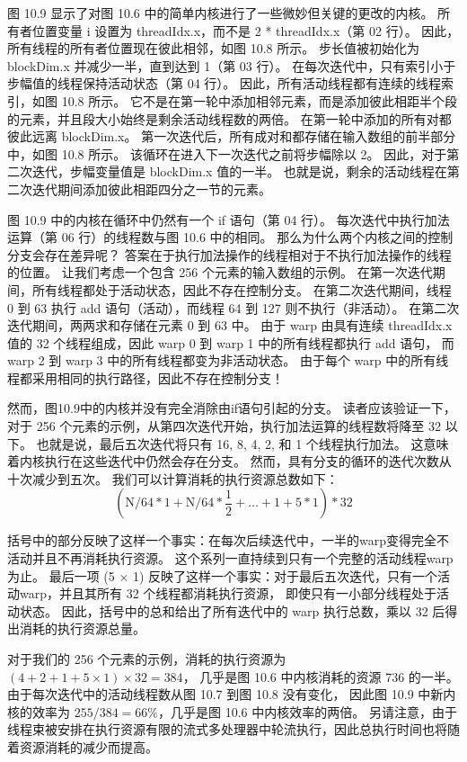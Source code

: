 图 10.9 显示了对图 10.6 中的简单内核进行了一些微妙但关键的更改的内核。 
所有者位置变量 i 设置为 threadIdx.x，而不是 2 * threadIdx.x（第 02 行）。 
因此，所有线程的所有者位置现在彼此相邻，如图 10.8 所示。 
步长值被初始化为 blockDim.x 并减少一半，直到达到 1（第 03 行）。 
在每次迭代中，只有索引小于步幅值的线程保持活动状态（第 04 行）。 因此，所有活动线程都有连续的线程索引，如图 10.8 所示。 
它不是在第一轮中添加相邻元素，而是添加彼此相距半个段的元素，并且段大小始终是剩余活动线程数的两倍。 
在第一轮中添加的所有对都彼此远离 blockDim.x。 第一次迭代后，所有成对和都存储在输入数组的前半部分中，如图 10.8 所示。 
该循环在进入下一次迭代之前将步幅除以 2。 因此，对于第二次迭代，步幅变量值是 blockDim.x 值的一半。 
也就是说，剩余的活动线程在第二次迭代期间添加彼此相距四分之一节的元素。

图 10.9 中的内核在循环中仍然有一个 if 语句（第 04 行）。 
每次迭代中执行加法运算（第 06 行）的线程数与图 10.6 中的相同。 
那么为什么两个内核之间的控制分支会存在差异呢？ 答案在于执行加法操作的线程相对于不执行加法操作的线程的位置。 
让我们考虑一个包含 256 个元素的输入数组的示例。 在第一次迭代期间，所有线程都处于活动状态，因此不存在控制分支。 
在第二次迭代期间，线程 0 到 63 执行 add 语句（活动），而线程 64 到 127 则不执行（非活动）。 
在第二次迭代期间，两两求和存储在元素 0 到 63 中。 
由于 warp 由具有连续 threadIdx.x 值的 32 个线程组成，因此 warp 0 到 warp 1 中的所有线程都执行 add 语句，
而 warp 2 到 warp 3 中的所有线程都变为非活动状态。 
由于每个 warp 中的所有线程都采用相同的执行路径，因此不存在控制分支！

然而，图10.9中的内核并没有完全消除由if语句引起的分支。 
读者应该验证一下，对于 256 个元素的示例，从第四次迭代开始，执行加法运算的线程数将降至 32 以下。
也就是说，最后五次迭代将只有 16, 8, 4, 2, 和 1 个线程执行加法。 这意味着内核执行在这些迭代中仍然会存在分支。 
然而，具有分支的循环的迭代次数从十次减少到五次。 我们可以计算消耗的执行资源总数如下：
$$
\left(\mathrm{N} / 64 * 1+\mathrm{N} / 64 * \frac{1}{2}+\ldots+1+5* 1\right)* 32
$$

括号中的部分反映了这样一个事实：在每次后续迭代中，一半的warp变得完全不活动并且不再消耗执行资源。 
这个系列一直持续到只有一个完整的活动线程warp为止。 
最后一项 (5 × 1) 反映了这样一个事实：对于最后五次迭代，只有一个活动warp，并且其所有 32 个线程都消耗执行资源，
即使只有一小部分线程处于活动状态。 因此，括号中的总和给出了所有迭代中的 warp 执行总数，乘以 32 后得出消耗的执行资源总量。

对于我们的 256 个元素的示例，消耗的执行资源为 $(4+2+1+5 × 1) × 32 = 384$，
几乎是图 10.6 中内核消耗的资源 736 的一半。 
由于每次迭代中的活动线程数从图 10.7 到图 10.8 没有变化，
因此图 10.9 中新内核的效率为 $255/384 = 66\%$，几乎是图 10.6 中内核效率的两倍。 
另请注意，由于线程束被安排在执行资源有限的流式多处理器中轮流执行，因此总执行时间也将随着资源消耗的减少而提高。

